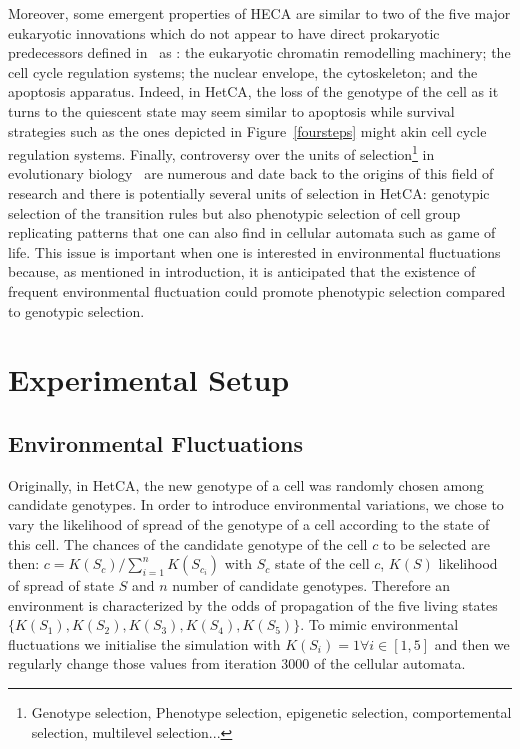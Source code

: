 \documentclass[letterpaper]{article}
\begin{document}
Moreover, some emergent properties of HECA are similar to two of the five major eukaryotic innovations which do not appear to have direct prokaryotic predecessors defined in~\citep{smith1997major} as : the eukaryotic chromatin remodelling machinery; the cell cycle regulation systems; the nuclear envelope, the cytoskeleton; and the apoptosis apparatus\citep{koonin2002origin}. Indeed, in HetCA, the loss of the genotype of the cell as it turns to the quiescent state may seem similar to apoptosis while survival strategies such as the ones depicted in Figure~\ref{foursteps} might akin cell cycle regulation systems.
Finally, controversy over the units of selection\footnote{Genotype selection, Phenotype selection, epigenetic selection, comportemental selection, multilevel selection...} in evolutionary biology~\citep{okasha2006evolution} are numerous and date back to the origins of this field of research and there is potentially several units of selection in HetCA: genotypic selection of the transition rules but also phenotypic selection of cell group replicating patterns that one can also find in cellular automata such as game of life.  This issue is important when one is interested in environmental fluctuations because, as mentioned in introduction, it is anticipated that the existence of frequent environmental fluctuation could promote phenotypic selection compared to genotypic selection.


\section{Experimental Setup}\label{sec:exsetup}
\subsection{Environmental Fluctuations}
Originally, in HetCA, the new genotype of a cell was randomly chosen among candidate genotypes. In order to introduce environmental variations, we chose to vary the likelihood of spread of the genotype of a cell according to the state of this cell. The chances of the candidate genotype of the cell $c$ to be selected are then: $c=K(S_c)/\sum_{i=1}^{n} K(S_{c_i})$ with $S_c$ state of the cell $c$, $K(S)$ likelihood of spread of state $S$ and $n$ number of candidate genotypes. Therefore an environment is characterized by the odds of propagation of the five living states $\{K(S_1),K(S_2),K(S_3),K(S_4),K(S_5)\}$.   
To mimic environmental fluctuations we initialise the simulation with $K(S_i)=1  \forall i \in [1,5]$ and then we regularly change those values from iteration 3000 of the cellular automata. 
\end{document}
